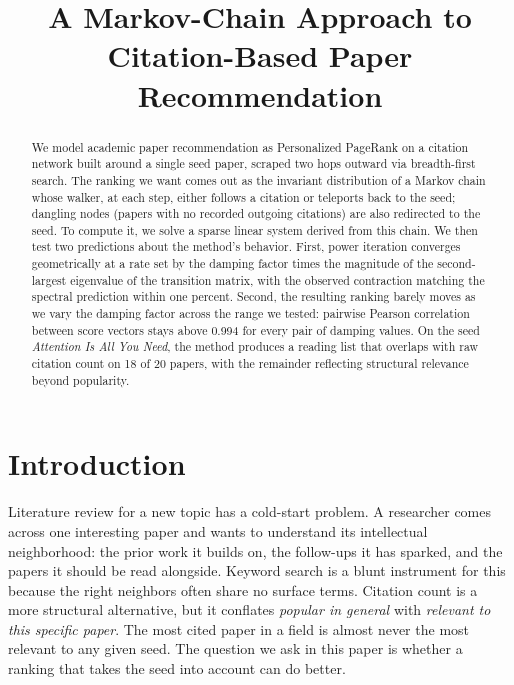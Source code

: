 \documentclass[conference]{IEEEtran}
\begin{document}
\title{A Markov-Chain Approach to Citation-Based Paper Recommendation}

\author{%
}

\maketitle

\begin{abstract}
We model academic paper recommendation as Personalized
PageRank on a citation network built around a single seed
paper, scraped two hops outward via breadth-first search. The
ranking we want comes out as the invariant distribution of a
Markov chain whose walker, at each step, either follows a
citation or teleports back to the seed; dangling nodes
(papers with no recorded outgoing citations) are also
redirected to the seed. To compute it, we solve a sparse linear system derived from
this chain. We then test two predictions about the method's
behavior. First, power iteration converges geometrically
at a rate set by the damping factor times the magnitude of the
second-largest eigenvalue of the transition matrix, with the
observed contraction matching the spectral prediction within
one percent. Second, the resulting ranking barely moves as we vary the
damping factor across the range we tested: pairwise Pearson
correlation between score vectors stays above 0.994 for every
pair of damping values. On the seed
\emph{Attention Is All You Need}, the method produces a
reading list that overlaps with raw citation count on 18 of 20
papers, with the remainder reflecting structural relevance
beyond popularity.
\end{abstract}

\section{Introduction}
\label{sec:intro}

Literature review for a new topic has a cold-start problem. A
researcher comes across one interesting paper and wants to
understand its intellectual neighborhood: the prior work it
builds on, the follow-ups it has sparked, and the papers it
should be read alongside. Keyword search is a blunt instrument
for this because the right neighbors often share no surface
terms. Citation count is a more structural alternative, but it
conflates \emph{popular in general} with \emph{relevant to this
specific paper}. The most cited paper in a field is almost never
the most relevant to any given seed. The question we ask in this paper
is whether a ranking that takes the seed into account can do
better.
\end{document}

